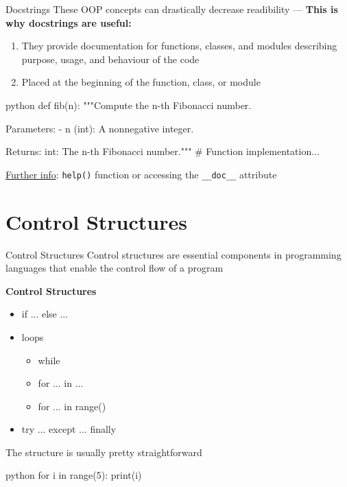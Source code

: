 \documentclass[
	11pt, 
]{beamer}
\begin{document}


\begin{frame}[fragile]{Docstrings}
These OOP concepts can drastically decrease readibility --- \textbf{This is why docstrings are useful:}
\vspace{.05cm}
\begin{enumerate}
    \item They provide documentation for functions, classes, and modules describing purpose, usage, and behaviour of the code
    \item Placed at the beginning of the function, class, or module
\end{enumerate}

\begin{mintedbox}{python}
def fib(n):
"""Compute the n-th Fibonacci number.

Parameters:
- n (int): A nonnegative integer.

Returns:
int: The n-th Fibonacci number."""
# Function implementation...
\end{mintedbox}

\underline{Further info}: \texttt{help()} function or accessing the \texttt{\_\_doc\_\_} attribute

\end{frame}


\section{Control Structures}
\begin{frame}[fragile]{Control Structures}
Control structures are essential components in programming languages that enable the control flow of a program

\begin{block}{\textbf{Control Structures}}
\begin{itemize}
\item if ... else ...
\item loops
\begin{itemize}
    \item while
    \item for ... in ...
    \item for ... in range()
\end{itemize}
\item try ... except ... finally
\end{itemize}
\end{block}

The structure is usually pretty straightforward

\begin{mintedbox}{python}
for i in range(5):
print(i)
\end{mintedbox}
\end{frame}
\end{document}

